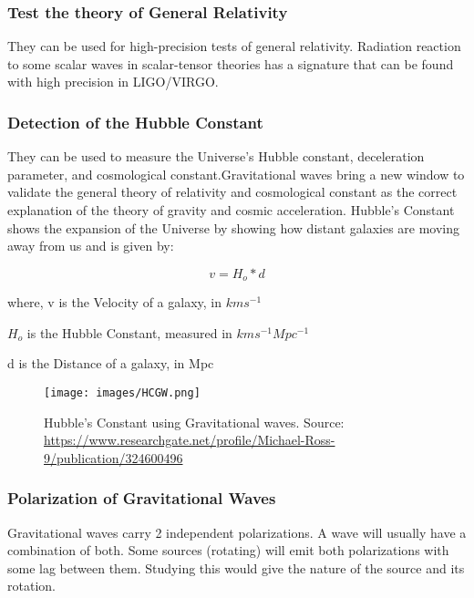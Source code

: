 \subsubsection{Test the theory of General Relativity}
\hspace{1cm}They can be used for high-precision tests of general relativity. Radiation reaction to some scalar waves in scalar-tensor theories has a signature that can be found with high precision in LIGO/VIRGO.

\subsubsection{Detection of the Hubble Constant}
\hspace{1cm}They can be used to measure the Universe’s Hubble constant, deceleration parameter, and cosmological constant.Gravitational waves bring a new window to validate the general theory of relativity and cosmological constant as the correct explanation of the theory of gravity and cosmic acceleration. Hubble's Constant shows the expansion of the Universe by showing how distant galaxies are moving away from us and is given by:
 
\begin{equation}
v = H_o*d
\end{equation}

where, v is the Velocity of a galaxy, in $kms^{-1}$

      $H_{o}$ is the Hubble Constant, measured in $kms^{-1}Mpc^{-1}$
      
      d is the Distance of a galaxy, in Mpc


\vspace{1cm}
\begin{figure}
    \centering
    \texttt{[image: images/HCGW.png]}
    \caption{Hubble's Constant using Gravitational waves. Source: \url{https://www.researchgate.net/profile/Michael-Ross-9/publication/324600496}}
\end{figure}
\subsubsection{Polarization of Gravitational Waves}
\hspace{1cm}Gravitational waves carry 2 independent polarizations. A wave will usually have a combination of both. Some sources (rotating) will emit both polarizations with some lag between them. Studying this would give the nature of the source and its rotation.


